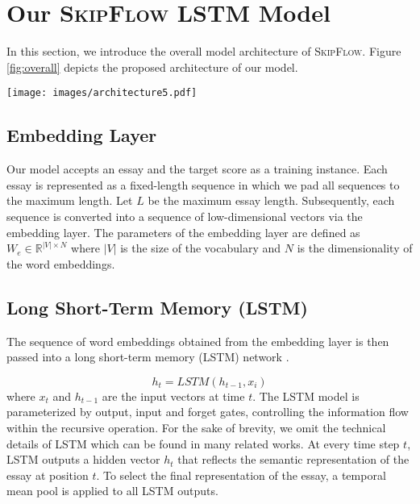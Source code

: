\documentclass[letterpaper]{article}
\begin{document}
\section{Our \textsc{SkipFlow} LSTM Model}
In this section, we introduce the overall model architecture of \textsc{SkipFlow}. Figure \ref{fig:overall} depicts the proposed architecture of our model. 

\begin{figure*}[ht]
  
  \centering
    \texttt{[image: images/architecture5.pdf]}
    \caption{Illustration of our proposed \textsc{SkipFlow} LSTM model with width $\delta$. Note that tensors depicted are \textbf{shared} parameters and there is only one tensor parameter in the entire architecture.}
    \label{fig:overall}
\end{figure*}

\subsection{Embedding Layer}
Our model accepts an essay and the target score as a training instance. Each essay is represented as a fixed-length sequence in which we pad all sequences to the maximum length. Let $L$ be the maximum essay length. Subsequently, each sequence is converted into a sequence of low-dimensional vectors via the embedding layer. The parameters of the embedding layer are defined as $W_e \in \mathbb{R}^{|V| \times N}$ where $|V|$ is the size of the vocabulary and $N$ is the dimensionality of the word embeddings. 

\subsection{Long Short-Term Memory (LSTM)}
The sequence of word embeddings obtained from the embedding layer is then passed into a long short-term memory (LSTM) network \cite{hochreiter1997long}.

\begin{equation}
h_{t} = LSTM(h_{t-1}, x_i)
\end{equation}
where $x_t$ and $h_{t-1}$ are the input vectors at time $t$. The LSTM model is parameterized by output, input and forget gates, controlling the information flow within the recursive operation. For the sake of brevity, we omit the technical details of LSTM which can be found in many related works. At every time step $t$, LSTM outputs a hidden vector $h_t$ that reflects the semantic representation of the essay at position $t$. To select the final representation of the essay, a temporal mean pool is applied to all LSTM outputs.
\end{document}
